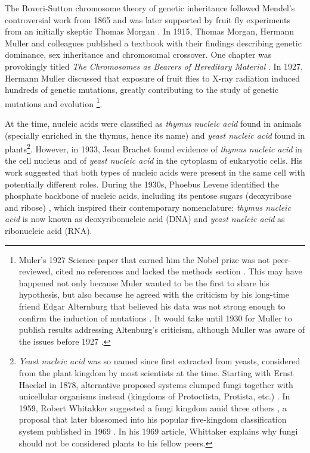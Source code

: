 The Boveri-Sutton chromosome theory of genetic inheritance followed Mendel's controversial \cite{} work from 1865 \cite{sutton:1902tx} and was later supported by fruit fly experiments from an initially skeptic \cite{} Thomas Morgan \cite{morgan:1915tw}. In 1915, Thomas Morgan, Hermann Muller and colleagues published a textbook with their findings describing genetic dominance, sex inheritance and chromosomal crossover. One chapter was provokingly titled \emph{The Chromosomes as Bearers of Hereditary Material} \cite{morgan:1915tw}. In 1927, Hermann Muller discussed that exposure of fruit flies to X-ray radiation induced hundreds of genetic mutations, greatly contributing to the study of genetic mutations and evolution \cite{muller:1927wl} \footnote{Muler's 1927 Science paper \cite{muller:1927wl} that earned him the Nobel prize was not peer-reviewed, cited no references and lacked the methods section \cite{calabrese:2018vl}. This may have happened not only because Muler wanted to be the first to share his hypothesis, but also because he agreed with the criticism by his long-time friend Edgar Alternburg that believed his data was not strong enough to confirm the induction of mutations \cite{calabrese:2018vl}. It would take until 1930 for Muller to publish results addressing Altenburg's criticism, although Muller was aware of the issues before 1927 \cite{calabrese:2018vl}.}.


At the time, nucleic acids were classified as \emph{thymus nucleic acid} found in animals (specially enriched in the thymus, hence its name) and \emph{yeast nucleic acid} found in plants\footnote{\emph{Yeast nucleic acid} was so named since first extracted from yeasts, considered from the plant kingdom by most scientists at the time. Starting with Ernst Haeckel in 1878, alternative proposed systems clumped fungi together with unicellular organisms instead (kingdoms of Protoctista, Protista, etc.) \cite{haeckel:1878tz}. In 1959, Robert Whitakker suggested a fungi kingdom amid three others \cite{whittaker:1959to}, a proposal that later blossomed into his popular five-kingdom classification system published in 1969 \cite{whittaker:1969to}. In his 1969 article, Whittaker explains why fungi should not be considered plants to his fellow peers.}. However, in 1933, Jean Brachet found evidence of \emph{thymus nucleic acid} in the cell nucleus and of \emph{yeast nucleic acid} in the cytoplasm of eukaryotic cells. His work suggested that both types of nucleic acids were present in the same cell with potentially different roles. During the 1930s, Phoebus Levene identified the phosphate backbone of nucleic acids, including its pentose sugars (deoxyribose and ribose) \cite{levene:1929ug}, which inspired their contemporary nomenclature: \emph{thymus nucleic acid} is now known as deoxyribonucleic acid (DNA) and \emph{yeast nucleic acid} as ribonucleic acid (RNA).

